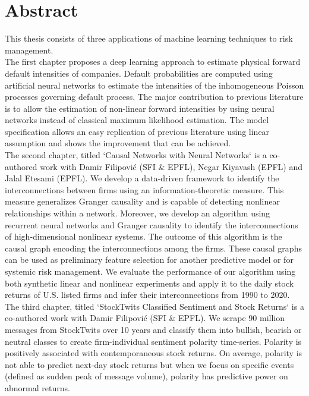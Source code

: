 

\cleardoublepage
\chapter*{Abstract}

This thesis consists of three applications of machine learning techniques to risk management. \\

The first chapter proposes a deep learning approach to estimate physical forward default intensities of companies. Default probabilities are computed using artificial neural networks to estimate the intensities of the inhomogeneous Poisson processes governing default process. The major contribution to previous literature is to allow the estimation of non-linear forward intensities by using neural networks instead of classical maximum likelihood estimation. The model specification allows an easy replication of previous literature using linear assumption and shows the improvement that can be achieved. \\

The second chapter, titled `Causal Networks with Neural Networks` is a co-authored work with Damir Filipović (SFI \& EPFL), Negar Kiyavash (EPFL) and Jalal Etesami (EPFL). We develop a data-driven framework to identify the interconnections between firms using an information-theoretic measure. 
This measure generalizes Granger causality and is capable of detecting nonlinear relationships within a network. 
Moreover, we develop an algorithm using recurrent neural networks and Granger causality to identify the interconnections of high-dimensional nonlinear systems. 
The outcome of this algorithm is the causal graph encoding the interconnections among the firms.
These causal graphs can be used as preliminary feature selection for another predictive model or for systemic risk management.
We evaluate the performance of our algorithm using both synthetic linear and nonlinear experiments and apply it to the daily stock returns of U.S. listed firms and infer their interconnections from 1990 to 2020. \\

The third chapter, titled `StockTwits Classified Sentiment and Stock Returns` is a co-authored work with Damir Filipović (SFI \& EPFL). We scrape 90 million messages from StockTwits over 10 years and classify them into bullish, bearish or neutral classes to create firm-individual sentiment polarity time-series. Polarity is positively associated with contemporaneous stock returns. On average, polarity is not able to predict next-day stock returns but when we focus on specific events (defined as sudden peak of message volume), polarity has predictive power on abnormal returns. \\

